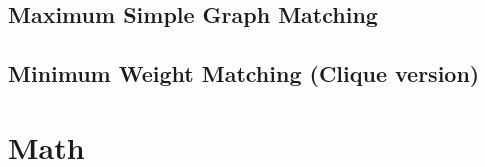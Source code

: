 \documentclass[a4paper,10pt,twocolumn,oneside]{article}
\begin{document}
%

%

\subsection{Maximum Simple Graph Matching}


\subsection{Minimum Weight Matching (Clique version)}


%


%

%

%

\section{Math}
\end{document}
